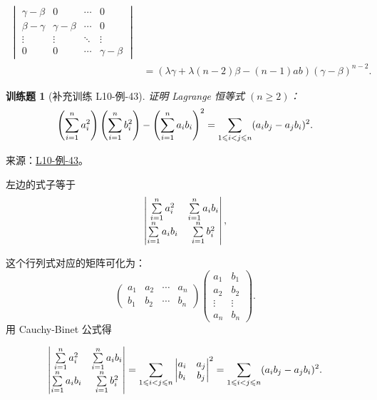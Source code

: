 \documentclass[12pt,fontset=fandol]{ctexart}
\newtheorem{exercise}{训练题}[section]
\begin{document}
\begin{solve}
\begin{align*}
\begin{vmatrix}
                                               \gamma-\beta & 0            & \cdots & 0            \\
                                               \beta-\gamma & \gamma-\beta & \cdots & 0            \\
                                               \vdots       & \vdots       & \ddots & \vdots       \\
                                               0            & 0            & \cdots & \gamma-\beta
                                           \end{vmatrix}           \\
                    & =(\lambda \gamma+\lambda(n-2)\beta-(n-1)ab)(\gamma-\beta)^{n-2}.
            \end{align*}
\end{solve}

\begin{exercise}[补充训练 L10-例-43]\label{prob:L10-例-43}
证明 Lagrange 恒等式 $(n \geqslant 2)$：
    \[ \left( \sum_{i=1}^{n}\limits a_i^2 \right) \left( \sum_{i=1}^{n}\limits b_i^2 \right) - \left( \sum_{i=1}^{n}\limits a_i b_i \right)^2 = \sum_{1 \leqslant i < j \leqslant n} (a_i b_j - a_j b_i)^2. \]
\end{exercise}
\noindent 来源：\href{https://github.com/yhwu-is/Linear-Algebra-Left-Undone/blob/new/%E8%AE%B2%E4%B9%89/%E4%B8%93%E9%A2%98/10%20%E8%A1%8C%E5%88%97%E5%BC%8F.tex}{L10-例-43}。
\begin{solve}
左边的式子等于
    \[ \begin{vmatrix}
        \sum_{i=1}^{n}\limits a_i^2 & \sum_{i=1}^{n}\limits a_i b_i \\
        \sum_{i=1}^{n}\limits a_i b_i & \sum_{i=1}^{n}\limits b_i^2
    \end{vmatrix}, \]

    这个行列式对应的矩阵可化为：
    \[ \begin{pmatrix}
        a_1 & a_2 & \cdots & a_n \\
        b_1 & b_2 & \cdots & b_n
    \end{pmatrix}
    \begin{pmatrix}
        a_1 & b_1 \\
        a_2 & b_2 \\
        \vdots & \vdots \\
        a_n & b_n
    \end{pmatrix}. \]
    用 Cauchy-Binet 公式得

    \[
    \begin{vmatrix}
        \sum_{i=1}^{n}\limits a_i^2 & \sum_{i=1}^{n}\limits a_i b_i \\
        \sum_{i=1}^{n}\limits a_i b_i & \sum_{i=1}^{n}\limits b_i^2
    \end{vmatrix}
    = \sum_{1 \leqslant i < j \leqslant n}
    \begin{vmatrix}
        a_i & a_j \\
        b_i & b_j
    \end{vmatrix}^2
    = \sum_{1 \leqslant i < j \leqslant n} (a_i b_j - a_j b_i)^2.
    \]
\end{solve}
\end{document}
